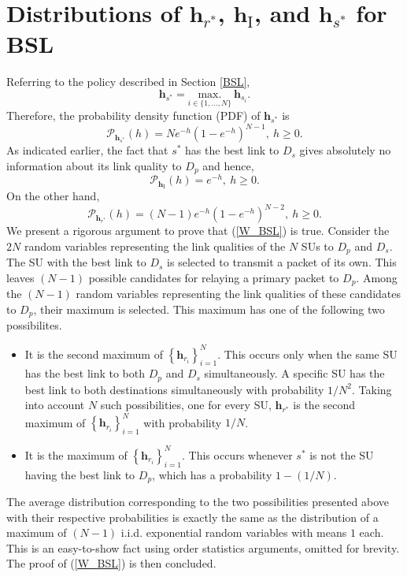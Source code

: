 \documentclass[journal,twocolumn]{IEEEtran}
\begin{document}
\section{Distributions of $\mathbf{h}_{r^*}$, $\mathbf{h}_{\mathrm{I}}$, and $\mathbf{h}_{s^*}$ for BSL} \label{BSL_dist}
Referring to the policy described in Section \ref{BSL}, 
\begin{equation}
\mathbf{h}_{s^*}=\underset{i \in \{1,\hdots,N\}}{{\mathrm{max.}}}~\mathbf{h}_{s_{i}}.
\end{equation}
Therefore, the probability density function (PDF) of $\mathbf{h}_{s^*}$ is
\begin{equation}\label{Y_BSL}
\mathcal{P}_{\mathbf{h}_{s^*}}(h)=N e^{-h} (1-e^{-h})^{N-1},~h \geq 0.
\end{equation}     
As indicated earlier, the fact that $s^*$ has the best link to $D_{s}$ gives absolutely no information about its link quality to $D_{p}$ and hence, 
\begin{equation}\label{X_BSL}
\mathcal{P}_{\mathbf{h}_{\mathrm{I}}}(h)=e^{-h},~ h \geq 0.
\end{equation}
On the other hand, 
\begin{equation}\label{W_BSL}
\mathcal{P}_{\mathbf{h}_{r^*}}(h)=(N-1) e^{-h} (1-e^{-h})^{N-2},~ h \geq 0.
\end{equation} 
We present a rigorous argument to prove that (\ref{W_BSL}) is true. Consider the $2N$ random variables representing the link qualities of the $N$ SUs to $D_{p}$ and $D_{s}$. The SU with the best link to $D_{s}$ is selected to transmit a packet of its own. This leaves $(N-1)$ possible candidates for relaying a primary packet to $D_{p}$. Among the $(N-1)$ random variables representing the link qualities of these candidates to $D_{p}$, their maximum is selected. This maximum has one of the following two possibilites. 
\begin{itemize}
\item It is the second maximum of $\left\{\mathbf{h}_{r_{i}}\right\}_{i=1}^{N}$. This occurs only when the same SU has the best link to both $D_{p}$ and $D_{s}$ simultaneously. A specific SU has the best link to both destinations simultaneously with probability $1/N^2$. Taking into account $N$ such possibilities, one for every SU, $\mathbf{h}_{r^*}$ is the second maximum of $\left\{\mathbf{h}_{r_{i}}\right\}_{i=1}^{N}$ with probability $1/N$. 
\item It is the maximum of $\left\{\mathbf{h}_{r_{i}}\right\}_{i=1}^{N}$. This occurs whenever $s^*$ is not the SU having the best link to $D_{p}$, which has a probability $1-(1/N)$.       
\end{itemize}      
The average distribution corresponding to the two possibilities presented above with their respective probabilities is exactly the same as the distribution of a maximum of $(N-1)$ i.i.d. exponential random variables with means $1$ each. This is an easy-to-show fact using order statistics arguments, omitted for brevity. The proof of (\ref{W_BSL}) is then concluded. 
\end{document}
